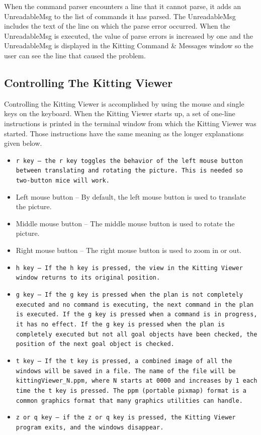 When the command parser encounters a line that it cannot parse, it adds
an \sf UnreadableMsg \rm to the list of commands it has parsed. The \sf
UnreadableMsg \rm includes the text of the line on which the parse error
occurred. When the \sf UnreadableMsg \rm is executed, the value of parse
errors is increased by one and the \sf UnreadableMsg \rm is displayed in
the Kitting Command \& Messages window so the user can see the line that
caused the problem.
  
\subsection{Controlling The Kitting Viewer}
Controlling the Kitting Viewer is accomplished by using the mouse and single
keys on the keyboard. When the Kitting Viewer starts up, a set of one-line
instructions is printed in the terminal window from which the
Kitting Viewer was started. Those instructions have the same meaning as
the longer explanations given below.

\begin{itemize}

\item \tt r \rm key -- the \tt r \rm key toggles the behavior of the
left mouse button between translating and rotating the picture. This is
needed so two-button mice will work.

\item Left mouse button -- By default, the left mouse button is used to
translate the picture.

\item Middle mouse button -- The middle mouse button is used to rotate the
picture.

\item Right mouse button -- The right mouse button is used to zoom in or
  out.

\item \tt h \rm key -- If the \tt h \rm key is pressed, the view in the
Kitting Viewer window returns to its original position.

\item \tt g \rm key -- If the \tt g \rm key is pressed when the plan is not
completely executed and no command is executing, the next command in the
plan is executed. If the \tt g \rm key is pressed when a command is in
progress, it has no effect. If the \tt g \rm key is pressed when the plan
is completely executed but not all goal objects have been checked, the
position of the next goal object is checked.

\item \tt t \rm key -- If the \tt t \rm key is pressed, a combined image of
all the windows will be saved in a file. The name of the file will be
kittingViewer\_N.ppm, where N starts at 0000 and increases by 1 each time
the t key is pressed. The ppm (portable pixmap) format is a common graphics
format that many graphics utilities can handle.

\item \tt z \rm or \tt q \rm key -- if the \tt z \rm or \tt q \rm key is
pressed, the Kitting Viewer program exits, and the windows disappear.

\end{itemize}


